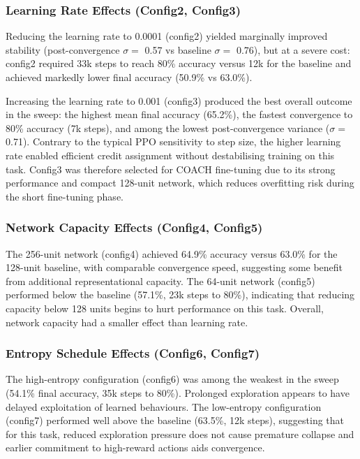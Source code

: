 \documentclass[../report.tex]{subfiles}
\begin{document}
    \subsubsection{Learning Rate Effects (Config2, Config3)}

    Reducing the learning rate to 0.0001 (config2) yielded marginally improved stability (post-convergence $\sigma = $ 0.57 vs baseline $\sigma = $ 0.76), but at a severe cost: config2 required 33k steps to reach 80\% accuracy versus 12k for the baseline and achieved markedly lower final accuracy (50.9\% vs 63.0\%).

    Increasing the learning rate to 0.001 (config3) produced the best overall outcome in the sweep: the highest mean final accuracy (65.2\%), the fastest convergence to 80\% accuracy (7k steps), and among the lowest post-convergence variance ($\sigma = $ 0.71). Contrary to the typical PPO sensitivity to step size, the higher learning rate enabled efficient credit assignment without destabilising training on this task. Config3 was therefore selected for COACH fine-tuning due to its strong performance and compact 128-unit network, which reduces overfitting risk during the short fine-tuning phase.

    \subsubsection{Network Capacity Effects (Config4, Config5)}

    The 256-unit network (config4) achieved 64.9\% accuracy versus 63.0\% for the 128-unit baseline, with comparable convergence speed, suggesting some benefit from additional representational capacity. The 64-unit network (config5) performed below the baseline (57.1\%, 23k steps to 80\%), indicating that reducing capacity below 128 units begins to hurt performance on this task. Overall, network capacity had a smaller effect than learning rate.

    \subsubsection{Entropy Schedule Effects (Config6, Config7)}

    The high-entropy configuration (config6) was among the weakest in the sweep (54.1\% final accuracy, 35k steps to 80\%). Prolonged exploration appears to have delayed exploitation of learned behaviours. The low-entropy configuration (config7) performed well above the baseline (63.5\%, 12k steps), suggesting that for this task, reduced exploration pressure does not cause premature collapse and earlier commitment to high-reward actions aids convergence.
\end{document}
